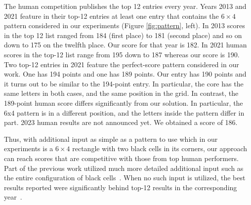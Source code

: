 The human competition publishes the top 12 entries every year.
Years 2013 and 2021 feature in their top-12 entries at least one entry that contains the $6 \times 4$ pattern
considered in our experiments (Figure \ref{fig:pattern}, left).
In 2013 scores in the top 12 list ranged from 184 (first place) to 181 (second place) and so on down to 175 on the twelfth place. 
Our score for that year is 182.
In 2021 human scores in the top-12 list range from 195 down to 187 whereas our score is 190.
Two top-12 entries in 2021 feature the perfect-score pattern considered in our work.
One has 194 points and one has 189 points. 
Our entry has 190 points and it turns out to be similar to the 194-point entry. In particular, the core has the same letters in both cases, and the same position in the grid.
In contrast, the 189-point human score differs significantly from our solution.
In particular, the 6x4 pattern is in a different position, and the letters inside the pattern differ in part.
2023 human results are not announced yet. We obtained a score of 186.

Thus, with additional input as simple as a pattern to use which 
in our experiments
is a $6 \times 4$ rectangle with two black cells in its corners,
our approach can reach scores that are competitive with those from top human performers.
Part of the previous work utilized much more detailed additional input such as the entire configuration of black cells~\cite{DBLP:conf/socs/BoteaB21}.
When no such input is utilized, 
the best results reported were significantly behind top-12 results in the corresponding
year~\cite{DBLP:conf/cig/BulitkoB21,Botea_Bulitko_2022}.




